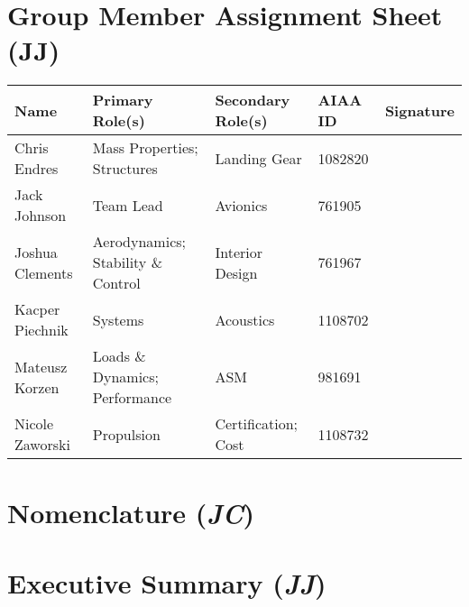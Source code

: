 \documentclass[conf]{new-aiaa}
\begin{document}
\section*{Group Member Assignment Sheet (JJ)}
\begin{center}
    \begin{tabular}{ |p{3cm}||p{3cm}|p{3cm}|p{1.5cm}|p{3cm}| }\toprule
         \textbf{Name} & \textbf{Primary Role(s)} & \textbf{Secondary Role(s)} & \textbf{AIAA ID} & \textbf{Signature} \\\hline
         Chris Endres & Mass Properties; \newline Structures & Landing Gear & 1082820 & \\
         Jack Johnson & Team Lead & Avionics & 761905 & \\ 
         Joshua Clements & Aerodynamics; \newline Stability \& Control & Interior Design & 761967 & \\ 
         Kacper Piechnik & Systems & Acoustics & 1108702 & \\ 
         Mateusz Korzen & Loads \& Dynamics; \newline Performance & ASM & 981691 & \\ 
         Nicole Zaworski & Propulsion & Certification; Cost & 1108732 & \\\bottomrule 
    \end{tabular}
\end{center}

\newpage
\tableofcontents

\newpage

\section*{Nomenclature (\textit{JC})}



\newpage \setcounter{section}{0}
\doublespacing

\section{Executive Summary (\textit{JJ})}
\label{section: Exec Summary}

\end{document}
